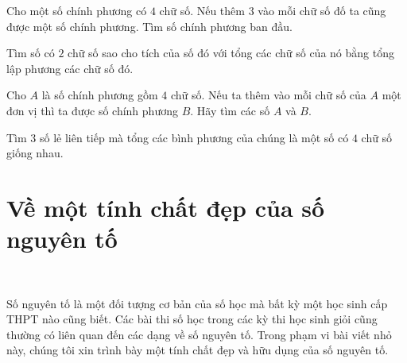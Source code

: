 \begin{bt}%
	Cho một số chính phương có $4$ chữ số. Nếu thêm $3$ vào mỗi chữ số đố ta cũng được một số chính phương. Tìm số chính phương ban đầu.	
\end{bt}
\begin{bt}%
	Tìm số có $2$ chữ số sao cho tích của số đó với tổng các chữ số của nó bằng tổng lập phương các chữ số đó.
\end{bt}
\begin{bt}%
	Cho $A$ là số chính phương gồm $4$ chữ số. Nếu ta thêm vào mỗi chữ số của $A$ một đơn vị thì ta được số chính phương $B$. Hãy tìm các số $A$ và $B$.
\end{bt}
\begin{bt}%
	Tìm $3$ số lẻ liên tiếp mà tổng các bình phương của chúng là một số có $4$ chữ số giống nhau.
\end{bt}




\section{Về một tính chất đẹp của số nguyên tố}
\begin{center}
	\textbf{\color{violet}{Cao Minh Quang\\
			(GV THPT Chuyên Nguyễn Bỉnh Khiêm, Vĩnh Long)}}\\
	\textbf{\color{violet}{Nguyễn Hữu Nghĩa\\
			(GV Đại học Xây dựng Miền Tây, Vĩnh Long)}}
\end{center}
Số nguyên tố là một đối tượng cơ bản của số học mà bất kỳ một học sinh cấp THPT nào cũng biết. Các bài thi số học trong các kỳ thi học sinh giỏi cũng thường có liên quan đến các dạng về số nguyên tố. Trong phạm vi bài viết nhỏ này, chúng tôi xin trình bày một tính chất đẹp và hữu dụng của số nguyên tố.
